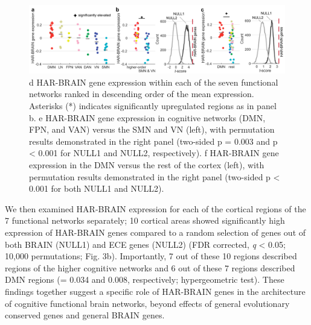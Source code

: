 \begin{refsection}
\begin{figure}[h]
    \centering
    \includegraphics[width=\linewidth]{images/harFig4.png}
    \caption{d HAR-BRAIN gene expression within each of the seven functional networks ranked in descending order of the mean expression. Asterisks (*) indicates significantly upregulated regions as in panel b. e HAR-BRAIN gene expression in cognitive networks (DMN, FPN, and VAN) versus the SMN and VN (left), with permutation results demonstrated in the right panel (two-sided p = 0.003 and p < 0.001 for NULL1 and NULL2, respectively). f HAR-BRAIN gene expression in the DMN versus the rest of the cortex (left), with permutation results demonstrated in the right panel (two-sided p < 0.001 for both NULL1 and NULL2).}
    \label{harFig4}
\end{figure}

We then examined HAR-BRAIN expression for each of the cortical regions of the 7 functional networks separately; 10 cortical areas showed significantly high expression of HAR-BRAIN genes compared to a random selection of genes out of both BRAIN (NULL1) and ECE genes (NULL2) (FDR corrected, \textit{q} < 0.05; 10,000 permutations; Fig. 3b). Importantly, 7 out of these 10 regions described regions of the higher cognitive networks and 6 out of these 7 regions described DMN regions (\pval = 0.034 and 0.008, respectively; hypergeometric test). These findings together suggest a specific role of HAR-BRAIN genes in the architecture of cognitive functional brain networks, beyond effects of general evolutionary conserved genes and general BRAIN genes.


\end{refsection}
